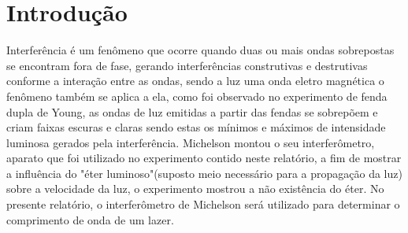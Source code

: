 \section{Introdução}
Interferência é um fenômeno que ocorre quando duas ou mais ondas sobrepostas se encontram fora de fase, gerando interferências construtivas e destrutivas conforme a interação entre as ondas, sendo a luz uma onda eletro magnética o fenômeno também se aplica a ela, como foi observado no experimento de fenda dupla de Young, as ondas de luz emitidas a partir das fendas se sobrepõem e criam faixas escuras e claras sendo estas os mínimos e máximos de intensidade luminosa gerados pela interferência. Michelson montou o seu interferômetro, aparato que foi utilizado no experimento contido neste relatório, a fim de mostrar a influência do "éter luminoso"(suposto meio necessário para a propagação da luz) sobre a velocidade da luz, o experimento mostrou a não existência do éter. 
No presente relatório, o interferômetro de Michelson será utilizado para determinar o comprimento de onda de um lazer.
